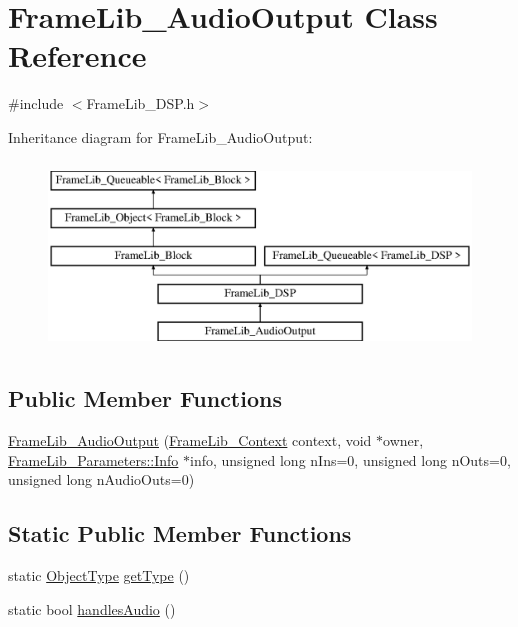 \hypertarget{class_frame_lib___audio_output}{}\section{Frame\+Lib\+\_\+\+Audio\+Output Class Reference}
\label{class_frame_lib___audio_output}


{\ttfamily \#include $<$Frame\+Lib\+\_\+\+D\+S\+P.\+h$>$}

Inheritance diagram for Frame\+Lib\+\_\+\+Audio\+Output\+:\begin{figure}[H]
\begin{center}
\leavevmode
\includegraphics[height=5.000000cm]{class_frame_lib___audio_output}
\end{center}
\end{figure}
\subsection*{Public Member Functions}
\begin{DoxyCompactItemize}
\item 
\hyperlink{class_frame_lib___audio_output_aa63caeed1cdb5887b1a81f1de2b300a1}{Frame\+Lib\+\_\+\+Audio\+Output} (\hyperlink{class_frame_lib___context}{Frame\+Lib\+\_\+\+Context} context, void $\ast$owner, \hyperlink{class_frame_lib___parameters_1_1_info}{Frame\+Lib\+\_\+\+Parameters\+::\+Info} $\ast$info, unsigned long n\+Ins=0, unsigned long n\+Outs=0, unsigned long n\+Audio\+Outs=0)
\end{DoxyCompactItemize}
\subsection*{Static Public Member Functions}
\begin{DoxyCompactItemize}
\item 
static \hyperlink{_frame_lib___types_8h_a842c5e2e69277690b064bf363c017980}{Object\+Type} \hyperlink{class_frame_lib___audio_output_a99908793774ac5046c3e369bc9a19259}{get\+Type} ()
\item 
static bool \hyperlink{class_frame_lib___audio_output_a394659d38e6e48418faf75bbae4cbc01}{handles\+Audio} ()
\end{DoxyCompactItemize}
